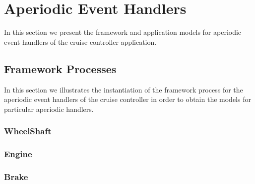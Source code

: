 \documentclass{article}
\begin{document}
\newpage


\section{Aperiodic Event Handlers}

In this section we present the framework and application models for aperiodic event handlers of the cruise controller application.


%

\subsection{Framework Processes}

In this section we illustrates the instantiation of the framework process for the aperiodic event handlers of the cruise controller in order to obtain the models for particular aperiodic handlers.

\subsubsection{WheelShaft}

\begin{circusbox}

\end{circusbox}

\subsubsection{Engine}

\begin{circusbox}

\end{circusbox}

\subsubsection{Brake}
\end{document}
